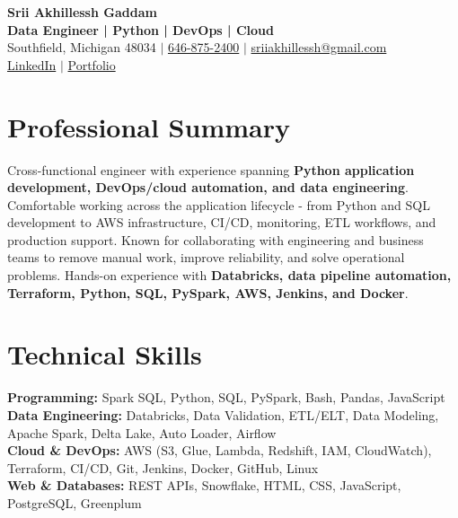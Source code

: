 \documentclass[letterpaper,10pt]{article}
\begin{document}
\fontsize{9.35pt}{10.45pt}\selectfont

\begin{center}
    {\LARGE \textbf{Srii Akhillessh Gaddam}} \\[-1pt]
    \textbf{Data Engineer | Python | DevOps | Cloud} \\[2pt]
    Southfield, Michigan 48034 $|$
    \href{tel:6468752400}{646-875-2400} $|$
    \href{mailto:sriiakhillessh@gmail.com}{sriiakhillessh@gmail.com} \\[1pt]
    \href{https://www.linkedin.com/in/srii-akhiilessh-gaddam-b48668191/}{LinkedIn} $|$
    \href{https://sriiakhillesshg.github.io/portfolio/}{Portfolio}
\end{center}
\vspace{-8pt}

\section{Professional Summary}
\small{Cross-functional engineer with experience spanning \textbf{Python application development, DevOps/cloud automation, and data engineering}. Comfortable working across the application lifecycle - from Python and SQL development to AWS infrastructure, CI/CD, monitoring, ETL workflows, and production support. Known for collaborating with engineering and business teams to remove manual work, improve reliability, and solve operational problems. Hands-on experience with \textbf{Databricks, data pipeline automation, Terraform, Python, SQL, PySpark, AWS, Jenkins, and Docker}.}

\section{Technical Skills}
\small{
\textbf{Programming:} Spark SQL, Python, SQL, PySpark, Bash, Pandas, JavaScript \\
\textbf{Data Engineering:} Databricks, Data Validation, ETL/ELT, Data Modeling, Apache Spark, Delta Lake, Auto Loader, Airflow \\
\textbf{Cloud \& DevOps:} AWS (S3, Glue, Lambda, Redshift, IAM, CloudWatch), Terraform, CI/CD, Git, Jenkins, Docker, GitHub, Linux \\
\textbf{Web \& Databases:} REST APIs, Snowflake, HTML, CSS, JavaScript, PostgreSQL, Greenplum
}

\end{document}
